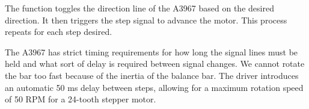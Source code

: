The function toggles the direction line of the A3967 based on the desired direction. It then triggers the step signal to advance the motor. This process repeats for each step desired. 

The A3967 has strict timing requirements for how long the signal lines must be held and what sort of delay is required between signal changes. We cannot rotate the bar too fast because of the inertia of the balance bar. The driver introduces an automatic 50 ms delay between steps, allowing for a maximum rotation speed of 50 RPM for a 24-tooth stepper motor.
